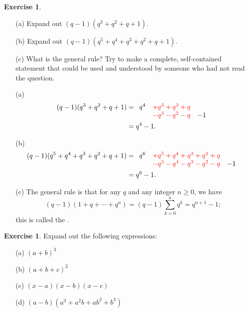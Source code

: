 \documentclass[a4paper]{book}
\theoremstyle{definition}
\newtheorem{exercise}[theorem]{Exercise}
\renewenvironment{solution}{\SolutionInline}{\endSolutionInline}
\begin{document}
\begin{exercise}
 \begin{itemize}
  \item[(a)] Expand out $(q-1)(q^3+q^2+q+1)$.
  \item[(b)] Expand out $(q-1)(q^5+q^4+q^3+q^2+q+1)$.
  \item[(c)] What is the general rule?  Try to make a complete,
   self-contained statement that could be used and understood by
   someone who had not read the question.
 \end{itemize}
\end{exercise}
\begin{solution}
 \begin{itemize}
  \item[(a)] \ghost\vspace{-5ex}
   \begin{align*}
    (q-1)(q^3+q^2+q+1) &=
     \raisebox{-1.3ex}{$\begin{array}{lll}
      q^4 &\RED{+q^3+q^2+q}& \\
      &\RED{-q^3-q^2-q}&-1
     \end{array}$} \\
    &= q^4-1.
   \end{align*}
  \item[(b)] \ghost\vspace{-5ex}
   \begin{align*}
    (q-1)(q^5+q^4+q^3+q^2+q+1) &=
     \raisebox{-1.3ex}{$\begin{array}{lll}
      q^6 &\RED{+q^5+q^4+q^3+q^2+q}& \\
      &\RED{-q^5-q^4-q^3-q^2-q}&-1
     \end{array}$} \\
    &= q^6-1.
   \end{align*}
  \item[(c)] The general rule is that for any $q$ and any integer
   $n\geq 0$, we have 
   \[ (q-1)(1+q+\dotsb+q^n) = (q-1)\sum_{k=0}^nq^k = 
       q^{n+1}-1; 
   \]
   this is called the .
 \end{itemize}
\end{solution}
\begin{exercise}
 Expand out the following expressions:
 \begin{itemize}
  \item[(a)] $(a+b)^3$
  \item[(b)] $(a+b+c)^2$
  \item[(c)] $(x-a)(x-b)(x-c)$
  \item[(d)] $(a-b)(a^3+a^2b+ab^2+b^3)$
 \end{itemize}
\end{exercise}
\end{document}
